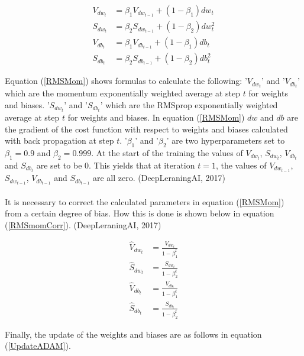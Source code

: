 \documentclass{article}
\begin{document}
\begin{equation}\label{RMSMom}
\begin{aligned}
    V_{{dw}_t} &= \beta_1 V_{dw_{t-1}} + (1 - \beta_1) dw_t\\
    S_{{dw}_t} &= \beta_2 S_{dw_{t-1}} + (1 - \beta_2) dw_t^2\\
    V_{{db}_t} &= \beta_1 V_{db_{t-1}} + (1 - \beta_1) db_t\\
    S_{{db}_t} &= \beta_2 S_{db_{t-1}} + (1 - \beta_2) db_t^2
\end{aligned}
\end{equation}

\noindent Equation (\ref{RMSMom}) shows formulas to calculate the following: '$V_{{dw}_t}$' and '$V_{{db}_t}$' which are the momentum exponentially weighted average at step $t$ for weights and biases. '$S_{{dw}_t}$' and '$S_{{db}_t}$' which are the RMSprop exponentially weighted average at step $t$ for weights and biases. In equation (\ref{RMSMom}) $dw$ and $db$ are the gradient of the cost function with respect to weights and biases calculated with back propagation at step $t$. '$\beta_1$' and '$\beta_2$' are two hyperparameters set to $\beta_1 = 0.9$ and $\beta_2 = 0.999$. At the start of the training the values of $V_{{dw}_t}$, $S_{{dw}_t}$, $V_{{db}_t}$ and $S_{{db}_t}$ are set to be 0. This yields that at iteration $t = 1$, the values of $V_{{dw}_{t-1}}$, $S_{{dw}_{t-1}}$, $V_{{db}_{t-1}}$ and $S_{{db}_{t-1}}$ are all zero. (DeepLeraningAI, 2017)\\\\
\noindent It is necessary to correct the calculated parameters in equation (\ref{RMSMom}) from a certain degree of bias. How this is done is shown below in equation (\ref{RMSmomCorr}). (DeepLeraningAI, 2017)

\begin{equation}\label{RMSmomCorr}
\begin{aligned}
\hat{V}_{{dw}_t} &= \frac{V_{{dw}_t}}{1 - \beta_1^t}\\
\hat{S}_{{dw}_t} &= \frac{S_{{dw}_t}}{1 - \beta^t_2}\\
\hat{V}_{{db}_t} &= \frac{V_{{db}_t}}{1 - \beta_1^t}\\
\hat{S}_{{db}_t} &= \frac{S_{{db}_t}}{1 - \beta^t_2}
\end{aligned}
\end{equation}

\noindent Finally, the update of the weights and biases are as follows in equation (\ref{UpdateADAM}).
\end{document}
